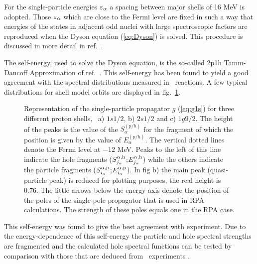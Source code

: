 For the single-particle energies $\varepsilon_{\alpha}$ a spacing between major
shells of 16 MeV is adopted. Those
$\varepsilon_{\alpha}$ which are close to the Fermi level are fixed in such a 
way
that energies of the states in adjacent odd nuclei with large spectroscopic
factors are reproduced when the Dyson equation (\ref{eq:Dyson}) is solved. 
This procedure
is discussed in more detail in
ref.~\cite{BRM91}.

The self-energy, used to solve the Dyson equation, is the so-called 
2p1h Tamm-Dancoff Approximation of ref.~\cite{RGBA93}. This self-energy
has been found to yield a good agreement with the 
spectral distributions measured in \eep\ reactions. A few typical 
distributions for shell model orbits are displayed in fig.~\ref{fig:gees}.
%
%
\begin{figure}
\centerline{
}
\caption[]{%
Representation of the single-particle propagator $g$ (\ref{eq:g1s}) for
three different proton shells, \viz\ a) $1s1/2$, b) $2s1/2$ and c) $1g9/2$.
The height of the peaks is the value of the $S_\alpha^{(p/h)}$ for the
fragment of which the position is given by the value of $E_\alpha^{(p/h)}$.
The vertical dotted lines denote the Fermi level at $-12$ MeV. Peaks to the
left of this line indicate the hole fragments ($S^{\alpha,{\rm h}}_{j_{\alpha}}$;$E^{\alpha,{\rm h}}_{j_{\alpha}}$)
while the others indicate the particle fragments
($S^{\alpha,{\rm p}}_{i_{\alpha}}$;$E^{\alpha,{\rm p}}_{i_{\alpha}}$).
In fig b) the main peak (quasi-particle peak) is reduced for plotting purposes,
the real height is $0.76$. The little arrows below the energy axis denote
the position of the poles of the single-pole propagator that is used in
RPA calculations. The strength of these poles equals one in the RPA case.
\label{fig:gees}}
\end{figure}
This self-energy was found to give the best agreement with experiment.
Due to the energy-dependence of this self-energy the
particle and hole spectral strengths are fragmented and the calculated hole
spectral functions can be tested by comparison with those that are deduced
from \eep\ experiments%
\cite{HBJ88,BRM91,RAD92,WiH90,SBJ88,KBB89,SW91}.  

%
